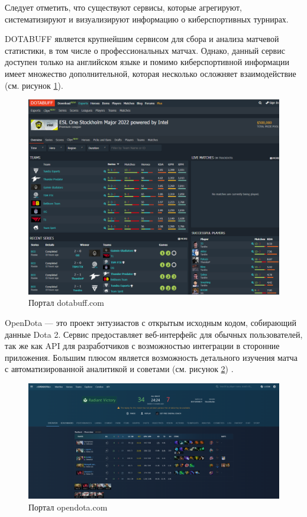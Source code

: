 Следует отметить, что существуют сервисы, которые агрегируют, систематизируют и визуализируют информацию о киберспортивных турнирах.

DOTABUFF является крупнейшим сервисом для сбора и анализа матчевой статистики, в том числе о профессиональных матчах. Однако, данный сервис доступен только на английском языке и помимо киберспортивной информации имеет множество дополнительной, которая несколько осложняет взаимодействие (см. рисунок \ref{fig:dotabuff}).

\begin{figure}[h!btp]
	\centering
	\includegraphics[width=450pt]{inc/img/dotabuff.png}
	\caption{Портал dotabuff.com}
	\label{fig:dotabuff}	
\end{figure}

OpenDota --- это проект энтузиастов с открытым исходным кодом, собирающий данные Dota 2. Сервис предоставляет веб-интерфейс для обычных пользователей, так же как API для разработчиков с возможностью интеграции в сторонние приложения. Большим плюсом является возможность детального изучения матча с автоматизированной аналитикой и советами  (см. рисунок \ref{fig:opendota}) \cite{opendota}.

\begin{figure}[h!btp]
	\centering
	\includegraphics[width=450pt]{inc/img/opendota.png}
	\caption{Портал opendota.com}
	\label{fig:opendota}	
\end{figure}

